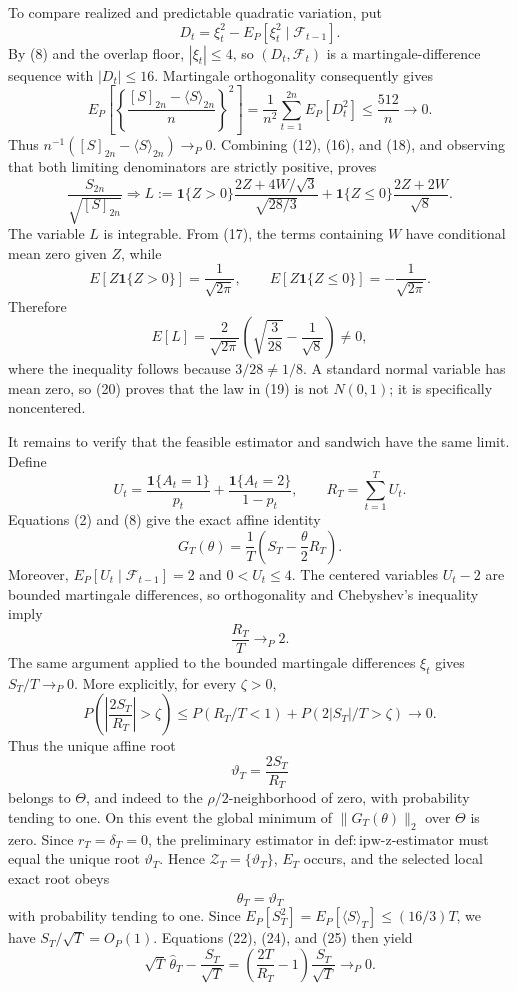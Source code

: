 To compare realized and predictable quadratic variation, put
\[
D_t=\xi_t^2-E_P[\xi_t^2\mid\mathcal F_{t-1}].
\]
By (8) and the overlap floor, \(|\xi_t|\le4\), so \((D_t,\mathcal F_t)\) is a martingale-difference sequence with \(|D_t|\le16\). Martingale orthogonality consequently gives
\[
E_P\left[\left\{\frac{[S]_{2n}-\langle S\rangle_{2n}}{n}\right\}^2\right]
=\frac1{n^2}\sum_{t=1}^{2n}E_P[D_t^2]
\le\frac{512}{n}\longrightarrow0.
\tag{18}
\]
Thus \(n^{-1}([S]_{2n}-\langle S\rangle_{2n})\to_P0\). Combining (12), (16), and (18), and observing that both limiting denominators are strictly positive, proves
\[
\frac{S_{2n}}{\sqrt{[S]_{2n}}}
\Longrightarrow
L:=\mathbf1\{Z>0\}\frac{2Z+4W/\sqrt3}{\sqrt{28/3}}
+\mathbf1\{Z\le0\}\frac{2Z+2W}{\sqrt8}.
\tag{19}
\]
The variable \(L\) is integrable. From (17), the terms containing \(W\) have conditional mean zero given \(Z\), while
\[
E[Z\mathbf1\{Z>0\}]=\frac1{\sqrt{2\pi}},
\qquad
E[Z\mathbf1\{Z\le0\}]=-\frac1{\sqrt{2\pi}}.
\]
Therefore
\[
E[L]
=\frac2{\sqrt{2\pi}}
\left(\sqrt{\frac3{28}}-\frac1{\sqrt8}\right)\ne0,
\tag{20}
\]
where the inequality follows because \(3/28\ne1/8\). A standard normal variable has mean zero, so (20) proves that the law in (19) is not \(N(0,1)\); it is specifically noncentered.

It remains to verify that the feasible estimator and sandwich have the same limit. Define
\[
U_t=\frac{\mathbf1\{A_t=1\}}{p_t}
+\frac{\mathbf1\{A_t=2\}}{1-p_t},
\qquad R_T=\sum_{t=1}^TU_t.
\]
Equations (2) and (8) give the exact affine identity
\[
G_T(\theta)=\frac1T\left(S_T-\frac\theta2R_T\right).
\tag{21}
\]
Moreover, \(E_P[U_t\mid\mathcal F_{t-1}]=2\) and \(0<U_t\le4\). The centered variables \(U_t-2\) are bounded martingale differences, so orthogonality and Chebyshev's inequality imply
\[
\frac{R_T}{T}\to_P2.
\tag{22}
\]
The same argument applied to the bounded martingale differences \(\xi_t\) gives \(S_T/T\to_P0\). More explicitly, for every \(\zeta>0\),
\[
P\left(\left|\frac{2S_T}{R_T}\right|>\zeta\right)
\le P(R_T/T<1)+P(2|S_T|/T>\zeta)\longrightarrow0.
\tag{23}
\]
Thus the unique affine root
\[
\vartheta_T=\frac{2S_T}{R_T}
\tag{24}
\]
belongs to \(\Theta\), and indeed to the \(\rho/2\)-neighborhood of zero, with probability tending to one. On this event the global minimum of \(\|G_T(\theta)\|_2\) over \(\Theta\) is zero. Since \(r_T=\delta_T=0\), the preliminary estimator in \(\mathrm{def:ipw\text{-}z\text{-}estimator}\) must equal the unique root \(\vartheta_T\). Hence \(\mathcal Z_T=\{\vartheta_T\}\), \(E_T\) occurs, and the selected local exact root obeys
\[
\widehat\theta_T=\vartheta_T
\tag{25}
\]
with probability tending to one. Since \(E_P[S_T^2]=E_P[\langle S\rangle_T]\le(16/3)T\), we have \(S_T/\sqrt T=O_P(1)\). Equations (22), (24), and (25) then yield
\[
\sqrt T\,\widehat\theta_T-\frac{S_T}{\sqrt T}
=\left(\frac{2T}{R_T}-1\right)\frac{S_T}{\sqrt T}
\to_P0.
\tag{26}
\]

